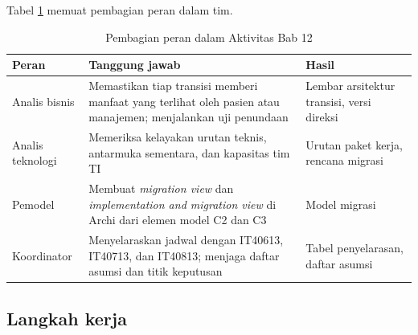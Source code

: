 Tabel \ref{tab:ch12-peran} memuat pembagian peran dalam tim.

\begin{table}[!htb]
  \centering
  \caption{Pembagian peran dalam Aktivitas Bab 12}
  \label{tab:ch12-peran}
  \begin{tabularx}{\textwidth}{>{\raggedright\arraybackslash}p{2.1cm}
                               >{\raggedright\arraybackslash}X
                               >{\raggedright\arraybackslash}p{3.3cm}}
    \hline
    \textbf{Peran} & \textbf{Tanggung jawab} & \textbf{Hasil} \\
    \hline
    Analis bisnis & Memastikan tiap transisi memberi manfaat yang terlihat
      oleh pasien atau manajemen; menjalankan uji penundaan & Lembar arsitektur
      transisi, versi direksi \\
    \hline
    Analis teknologi & Memeriksa kelayakan urutan teknis, antarmuka sementara,
      dan kapasitas tim TI & Urutan paket kerja, rencana migrasi \\
    \hline
    Pemodel & Membuat \textit{migration view} dan \textit{implementation and
      migration view} di Archi dari elemen model C2 dan C3 & Model migrasi \\
    \hline
    Koordinator & Menyelaraskan jadwal dengan IT40613, IT40713, dan IT40813;
      menjaga daftar asumsi dan titik keputusan & Tabel penyelarasan, daftar
      asumsi \\
    \hline
  \end{tabularx}
\end{table}

\subsection*{Langkah kerja}


